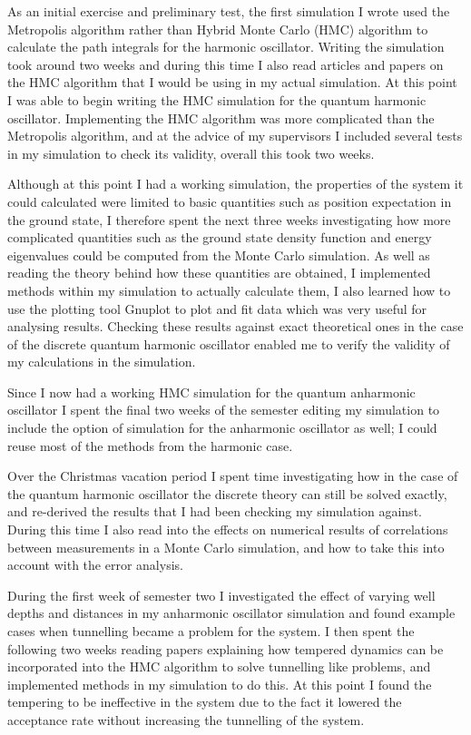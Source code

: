 \documentclass[12pt]{article}
\begin{document}
    As an initial exercise and preliminary test, the first simulation I wrote used the Metropolis algorithm rather than Hybrid Monte Carlo (HMC) algorithm to calculate the path integrals for the harmonic oscillator. Writing the simulation took around two weeks and during this time I also read articles and papers on the HMC algorithm that I would be using in my actual simulation. At this point I was able to begin writing the HMC simulation for the quantum harmonic oscillator. Implementing the HMC algorithm was more complicated than the Metropolis algorithm, and at the advice of my supervisors I included several tests in my simulation to check its validity, overall this took two weeks. 

    Although at this point I had a working simulation, the properties of the system it could calculated were limited to basic quantities such as position expectation in the ground state, I therefore spent the next three weeks investigating how more complicated quantities such as the ground state density function and energy eigenvalues could be computed from the Monte Carlo simulation. As well as reading the theory behind how these quantities are obtained, I implemented methods within my simulation to actually calculate them, I also learned how to use the plotting tool Gnuplot to plot and fit data which was very useful for analysing results. Checking these results against exact theoretical ones in the case of the discrete quantum harmonic oscillator enabled me to verify the validity of my calculations in the simulation. 

    Since I now had a working HMC simulation for the quantum anharmonic oscillator I spent the final two weeks of the semester editing my simulation to include the option of simulation for the anharmonic oscillator as well; I could reuse most of the methods from the harmonic case.

    Over the Christmas vacation period I spent time investigating how in the case of the quantum harmonic oscillator the discrete theory can still be solved exactly, and re-derived the results that I had been  checking my simulation against. During this time I also read into the effects on numerical results of correlations between measurements in a Monte Carlo simulation, and how to take this into account with the error analysis.

    During the first week of semester two I investigated the effect of varying well depths and distances in my anharmonic oscillator simulation and found example cases when tunnelling became a problem for the system. I then spent the following two weeks reading papers explaining how tempered dynamics can be incorporated into the HMC algorithm to solve tunnelling like problems, and implemented methods in my simulation to do this. At this point I found the tempering to be ineffective in the system due to the fact it lowered the acceptance rate without increasing the tunnelling of the system. 
\end{document}
